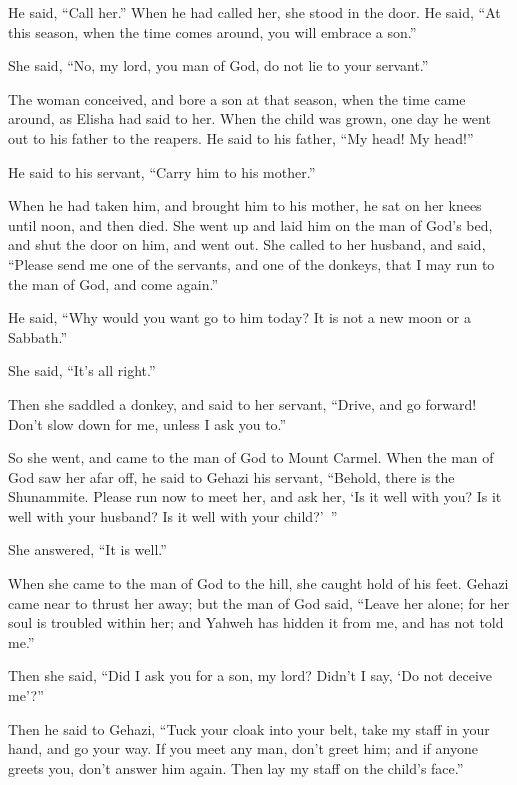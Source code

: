 {\par }{\PP {}He said, “Call her.” When he had called her, she stood in the door.
He said, “At this season, when the time comes around, you will embrace a son.”
\par }{\PP She said, “No, my lord, you man of God, do not lie to your servant.”
\par }{\PP {}The woman conceived, and bore a son at that season, when the time came around, as Elisha had said to her.
When the child was grown, one day he went out to his father to the reapers.
He said to his father, “My head! My head!”
\par }{\PP He said to his servant, “Carry him to his mother.”
\par }{\PP {}When he had taken him, and brought him to his mother, he sat on her knees until noon, and then died.
She went up and laid him on the man of God’s bed, and shut the door on him, and went out.
She called to her husband, and said, “Please send me one of the servants, and one of the donkeys, that I may run to the man of God, and come again.”
\par }{\PP {}He said, “Why would you want go to him today? It is not a new moon or a Sabbath.”
\par }{\PP She said, “It’s all right.”
\par }{\PP {}Then she saddled a donkey, and said to her servant, “Drive, and go forward! Don’t slow down for me, unless I ask you to.”
\par }{\PP {}So she went, and came to the man of God to Mount Carmel. When the man of God saw her afar off, he said to Gehazi his servant, “Behold, there is the Shunammite.
Please run now to meet her, and ask her, ‘Is it well with you? Is it well with your husband? Is it well with your child?’ ”
\par }{\PP She answered, “It is well.”
\par }{\PP {}When she came to the man of God to the hill, she caught hold of his feet. Gehazi came near to thrust her away; but the man of God said, “Leave her alone; for her soul is troubled within her; and Yahweh has hidden it from me, and has not told me.”
\par }{\PP {}Then she said, “Did I ask you for a son, my lord? Didn’t I say, ‘Do not deceive me’?”
\par }{\PP {}Then he said to Gehazi, “Tuck your cloak into your belt, take my staff in your hand, and go your way. If you meet any man, don’t greet him; and if anyone greets you, don’t answer him again. Then lay my staff on the child’s face.”
}
